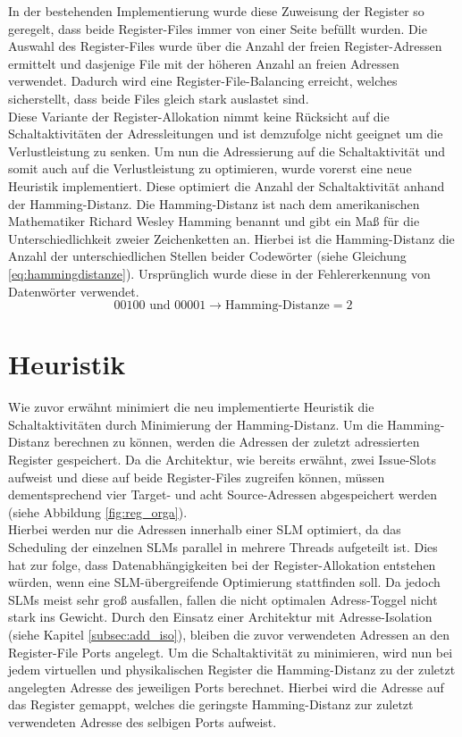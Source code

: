 In der bestehenden Implementierung wurde diese Zuweisung der Register so geregelt, dass beide Register-Files immer von einer Seite befüllt wurden. Die Auswahl des Register-Files wurde über die Anzahl der freien Register-Adressen ermittelt und dasjenige File mit der höheren Anzahl an freien Adressen verwendet. Dadurch wird eine Register-File-Balancing erreicht, welches sicherstellt, dass beide Files gleich stark auslastet sind.\\
Diese Variante der Register-Allokation nimmt keine Rücksicht auf die Schaltaktivitäten der Adressleitungen und ist demzufolge nicht geeignet um die Verlustleistung zu senken.
Um nun die Adressierung auf die Schaltaktivität und somit auch auf die Verlustleistung zu optimieren, wurde vorerst eine neue Heuristik implementiert.
Diese optimiert die Anzahl der Schaltaktivität anhand der Hamming-Distanz.
Die Hamming-Distanz ist nach dem amerikanischen Mathematiker Richard Wesley Hamming benannt und gibt ein Maß für die Unterschiedlichkeit zweier Zeichenketten an. Hierbei ist die Hamming-Distanz die Anzahl der unterschiedlichen Stellen beider Codewörter (siehe Gleichung \ref{eq:hammingdistanze}). Ursprünglich wurde diese in der Fehlererkennung von Datenwörter verwendet.\cite{hamming1950error} 
\begin{equation}
00100 \text{ und } 00001 \rightarrow \text{Hamming-Distanze}= 2
\label{eq:hammingdistanze}
\end{equation}
 
\section{Heuristik}
\label{sec:Heuristik}
Wie zuvor erwähnt minimiert die neu implementierte Heuristik die Schaltaktivitäten durch Minimierung der Hamming-Distanz. Um die Hamming-Distanz berechnen zu können, werden die Adressen der zuletzt adressierten Register gespeichert. Da die Architektur, wie bereits erwähnt, zwei Issue-Slots aufweist und diese auf beide Register-Files zugreifen können, müssen dementsprechend vier Target- und acht Source-Adressen abgespeichert werden (siehe Abbildung \ref{fig:reg_orga}).\\
Hierbei werden nur die Adressen innerhalb einer SLM optimiert, da das Scheduling der einzelnen SLMs parallel in mehrere Threads aufgeteilt ist. Dies hat zur folge, dass Datenabhängigkeiten bei der Register-Allokation entstehen würden, wenn eine SLM-übergreifende Optimierung stattfinden soll. Da jedoch SLMs meist sehr groß ausfallen, fallen die nicht optimalen Adress-Toggel nicht stark ins Gewicht. 
Durch den Einsatz einer Architektur mit Adresse-Isolation (siehe Kapitel \ref{subsec:add_iso}), bleiben die zuvor verwendeten Adressen an den Register-File Ports angelegt. Um die Schaltaktivität zu minimieren, wird nun bei jedem virtuellen und physikalischen Register die Hamming-Distanz zu der zuletzt angelegten Adresse des jeweiligen Ports berechnet. Hierbei wird die Adresse auf das Register gemappt, welches die geringste Hamming-Distanz zur zuletzt verwendeten Adresse des selbigen Ports aufweist.\\


